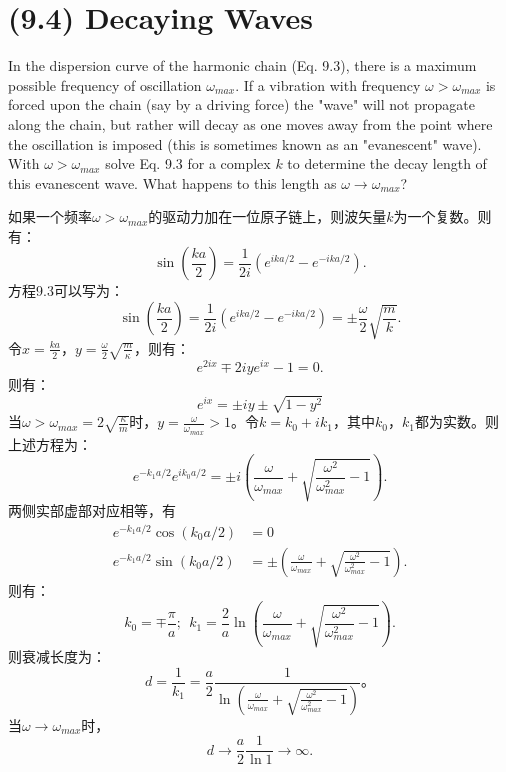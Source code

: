 \documentclass[reqno,a4paper,12pt]{amsart}
\begin{document}
\section{\textbf{(9.4) Decaying Waves}}
In the dispersion curve of the harmonic chain (Eq. 9.3), there is a maximum possible frequency of oscillation $\omega_{max}$. If a vibration with frequency $\omega > \omega_{max}$ is forced upon the chain (say by a driving force) the "wave" will not propagate along the chain, but rather will decay as one moves away from the point where the oscillation is imposed (this is sometimes known as an "evanescent" wave). With $\omega>\omega_{max}$ solve Eq. 9.3 for a complex $k$ to determine the decay length of this evanescent wave. What happens to this length as $\omega \to \omega_{max}$?
\begin{tcolorbox}[breakable, colback = black!5!white, colframe = black]
如果一个频率$\omega>\omega_{max}$的驱动力加在一位原子链上，则波矢量$k$为一个复数。则有：
\[
	\sin\left( \frac{ka}{2} \right) = \frac{1}{2i} \left( e^{ika/2} - e^{-ika/2} \right).
\]
方程9.3可以写为：
\[
	\sin\left( \frac{ka}{2} \right) = \frac{1}{2i} \left( e^{ika/2} - e^{-ika/2} \right) = \pm\frac{\omega}{2}\sqrt{\frac{m}{k}}.
\]
令$x = \frac{ka}{2}$，$y = \frac{\omega}{2}\sqrt{\frac{m}{\kappa}}$，则有：
\[
	e^{2ix} \mp 2iye^{ix} - 1 = 0.
\]
则有：
\[
	e^{ix} = \pm iy \pm \sqrt{1-y^2}
\]
当$\omega > \omega_{max} = 2\sqrt{\frac{\kappa}{m}}$时，$y = \frac{\omega}{\omega_{max}} > 1$。令$k = k_0+ik_1$，其中$k_0$，$k_1$都为实数。则上述方程为：
\[
	e^{-k_1a/2} e^{ik_0a/2} = \pm i\left( \frac{\omega}{\omega_{max}} +\sqrt{\frac{\omega^2}{\omega_{max}^2} - 1} \right).
\]
两侧实部虚部对应相等，有
\begin{align*}
	e^{-k_1a/2}\cos(k_0a/2) &= 0 \\
	e^{-k_1a/2}\sin(k_0a/2) &= \pm \left( \frac{\omega}{\omega_{max}} +\sqrt{\frac{\omega^2}{\omega_{max}^2} - 1} \right).
\end{align*}
则有：
\[
	k_0 = \mp \frac{\pi}{a}; ~~ k_1 = \frac{2}{a}\ln \left( \frac{\omega}{\omega_{max}} +\sqrt{\frac{\omega^2}{\omega_{max}^2} - 1} \right).
\]
则衰减长度为：
\[
	d = \frac{1}{k_1} = \frac{a}{2}\frac{1}{\ln \left( \frac{\omega}{\omega_{max}} +\sqrt{\frac{\omega^2}{\omega_{max}^2} - 1} \right)}。
\]
当$\omega \to \omega_{max}$时，
\[
	d \to \frac{a}{2} \frac{1}{\ln1} \to \infty.
\]
\end{tcolorbox}
\end{document}
